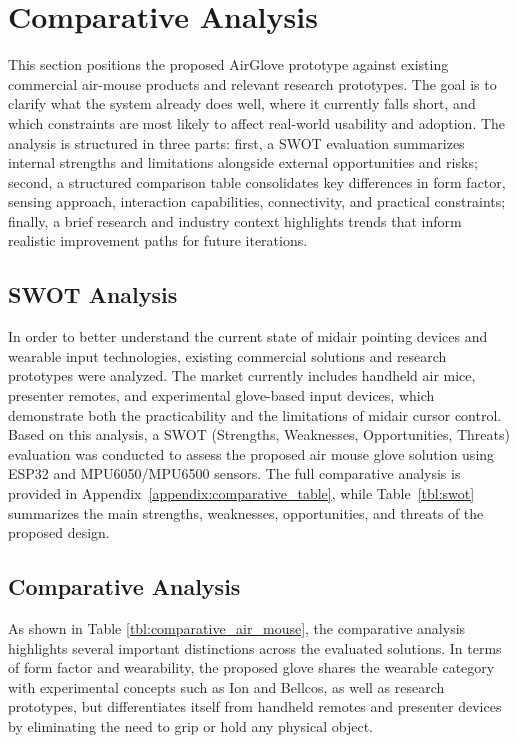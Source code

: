 \section{Comparative Analysis}
This section positions the proposed AirGlove prototype against existing commercial air-mouse products and relevant research prototypes. The goal is to clarify what the system already does well, where it currently falls short, and which constraints are most likely to affect real-world usability and adoption. The analysis is structured in three parts: first, a SWOT evaluation summarizes internal strengths and limitations alongside external opportunities and risks; second, a structured comparison table consolidates key differences in form factor, sensing approach, interaction capabilities, connectivity, and practical constraints; finally, a brief research and industry context highlights trends that inform realistic improvement paths for future iterations.

\subsection{SWOT Analysis}

In order to better understand the current state of midair pointing devices and wearable input technologies, existing commercial solutions and research prototypes were analyzed. The market currently includes handheld air mice, presenter remotes, and experimental glove-based input devices, which demonstrate both the practicability and the limitations of midair cursor control. Based on this analysis, a SWOT (Strengths, Weaknesses, Opportunities, Threats) evaluation was conducted to assess the proposed air mouse glove solution using ESP32 and MPU6050/MPU6500 sensors. The full comparative analysis is provided in Appendix~\ref{appendix:comparative_table}, while Table~\ref{tbl:swot} summarizes the main strengths, weaknesses, opportunities, and threats of the proposed design.


\subsection{Comparative Analysis}

As shown in Table \ref{tbl:comparative_air_mouse}, the comparative analysis highlights several important distinctions across the evaluated solutions. In terms of form factor and wearability, the proposed glove shares the wearable category with experimental concepts such as Ion and Bellcos, as well as research prototypes, but differentiates itself from handheld remotes and presenter devices by eliminating the need to grip or hold any physical object.

